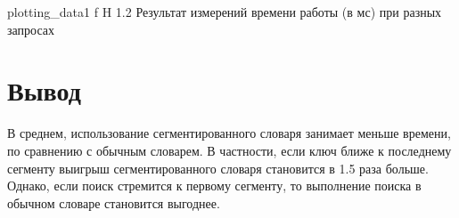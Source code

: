     {plotting_data1} %
    {f} %
    {H} %
    {1.2\textwidth} %
    {Результат измерений времени работы (в мс) при разных запросах} %


\clearpage

% 	


\section{Вывод}
В среднем, использование сегментированного словаря занимает меньше времени, по сравнению с обычным словарем. В частности, если ключ ближе к последнему сегменту выигрыш сегментированного словаря становится в 1.5 раза больше. Однако, если поиск стремится к первому сегменту, то выполнение поиска в обычном словаре становится выгоднее.